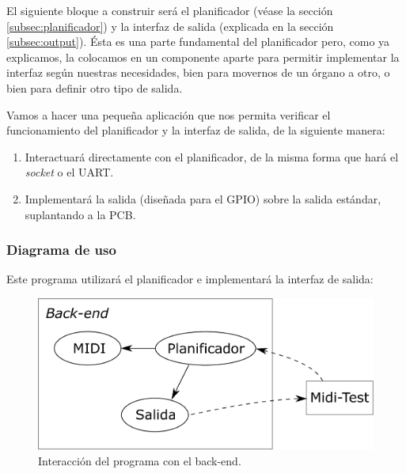 El siguiente bloque a construir será el planificador (véase la sección \ref{subsec:planificador}) y la interfaz de salida (explicada en la sección \ref{subsec:output}). Ésta es una parte fundamental del planificador pero, como ya explicamos, la colocamos en un componente aparte para permitir implementar la interfaz según nuestras necesidades, bien para movernos de un órgano a otro, o bien para definir otro tipo de salida.

Vamos a hacer una pequeña aplicación que nos permita verificar el funcionamiento del planificador y la interfaz de salida, de la siguiente manera:

\begin{enumerate}
	\item Interactuará directamente con el planificador, de la misma forma que hará el \textit{socket} o el \acrshort{UART}.
	\item Implementará la salida (diseñada para el \acrshort{GPIO}) sobre la salida estándar, suplantando a la \acrshort{PCB}.
\end{enumerate}

\subsubsection{Diagrama de uso}

Este programa utilizará el planificador e implementará la interfaz de salida:

\smallskip

\begin{figure}[H]
	\noindent \begin{centering}
		\includegraphics[width=\linewidth/2]{capitulo4/midi_test}
		\par\end{centering}
	\smallskip
	\caption{\label{fig:midi_test} Interacción del programa con el back-end.}
\end{figure} 

